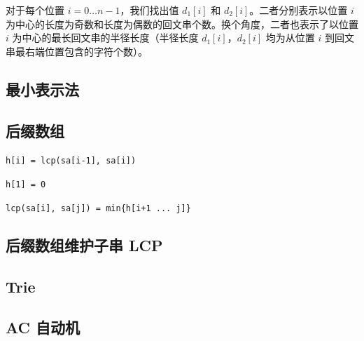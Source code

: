 \documentclass[12pt]{article}
\theoremstyle{definition}
\theoremstyle{remark}
\begin{document}
对于每个位置 $i = 0 \dots n - 1$，我们找出值 $d_1[i]$ 和 $d_2[i]$。二者分别表示以位置 $i$ 为中心的长度为奇数和长度为偶数的回文串个数。换个角度，二者也表示了以位置 $i$ 为中心的最长回文串的半径长度（半径长度 $d_1[i]$，$d_2[i]$ 均为从位置 $i$ 到回文串最右端位置包含的字符个数）。



\newpage

\subsection{最小表示法}



\newpage

\subsection{后缀数组}



\texttt{h[i] = lcp(sa[i-1], sa[i])}

\texttt{h[1] = 0}

\texttt{lcp(sa[i], sa[j]) = min\{h[i+1 ... j]\}}

\newpage

\subsection{后缀数组维护子串 LCP}



\newpage

\subsection{Trie}



\newpage

\subsection{AC 自动机}



\newpage
\end{document}
